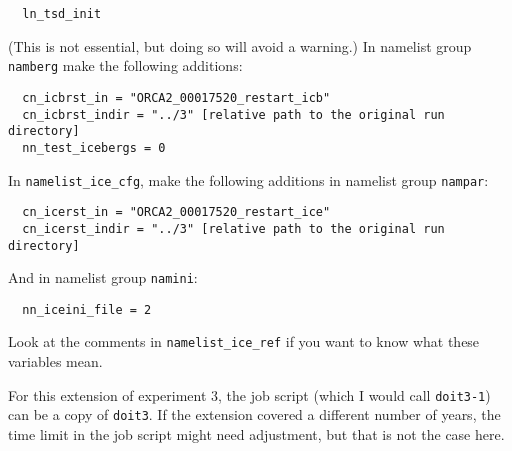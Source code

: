 \begin{verbatim}
  ln_tsd_init
\end{verbatim}

\noindent{}(This is not essential, but doing so will avoid a warning.)
In namelist group \verb|namberg| make the following additions:

\begin{verbatim}
  cn_icbrst_in = "ORCA2_00017520_restart_icb"
  cn_icbrst_indir = "../3" [relative path to the original run directory]
  nn_test_icebergs = 0
\end{verbatim}

In \verb|namelist_ice_cfg|, make the following additions in namelist group \verb|nampar|:

\begin{verbatim}
  cn_icerst_in = "ORCA2_00017520_restart_ice"
  cn_icerst_indir = "../3" [relative path to the original run directory]
\end{verbatim}

\noindent{}And in namelist group \verb|namini|:

\begin{verbatim}
  nn_iceini_file = 2
\end{verbatim}

\noindent{}Look at the comments in \verb|namelist_ice_ref| if you want to know what these variables mean.

For this extension of experiment 3, the job script (which I would call \verb|doit3-1|) can be a copy of \verb|doit3|.
If the extension covered a different number of years, the time limit in the job script might need adjustment, but that is not the case here.
